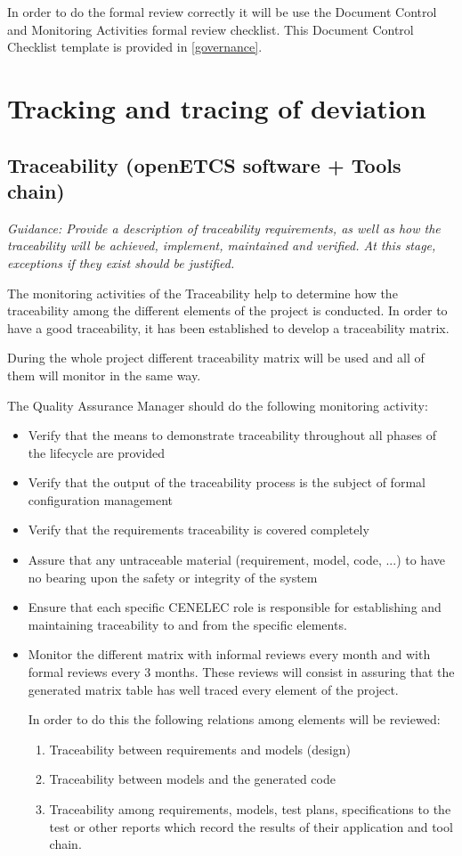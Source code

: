 \documentclass{template/openetcs_article}
\begin{document}
In order to do the formal review correctly it will be use the Document Control and Monitoring Activities formal review checklist.  This Document Control Checklist template is provided in \href{https://github.com/openETCS/governance/tree/master/Templates}{[governance]}.

\section{Tracking and tracing of deviation}

\subsection{Traceability (openETCS software + Tools chain)}
\textit{Guidance: Provide a description of traceability requirements, as well as how the traceability will be achieved, implement, maintained and verified. At this stage, exceptions if they exist should be justified.}

The monitoring activities of the Traceability help to determine how the traceability among the different elements of the project is conducted. In order to have a good traceability, it has been established to develop a traceability matrix. 

During the whole project different traceability matrix will be used and all of them will monitor in the same way.

The Quality Assurance Manager should do the following monitoring activity:
\begin{itemize}
\item Verify that the means to demonstrate traceability throughout all phases of the lifecycle are provided
\item Verify that the output of the traceability process is the subject of formal configuration management
\item Verify that the requirements traceability is covered completely
\item Assure that any untraceable material (requirement, model, code, ...) to have no bearing upon the safety or integrity of the system
\item Ensure that each specific CENELEC role is responsible for establishing and maintaining traceability to and from the specific elements.
\item Monitor the different matrix with informal reviews every month and with formal reviews every 3 months. These reviews will consist in assuring that the generated matrix table has well traced every element of the project.

In order to do this the following relations among elements will be reviewed:
\begin{enumerate}
\item Traceability between requirements and models (design)
\item Traceability between models and the generated code
\item Traceability among requirements, models, test plans, specifications to the test or other reports which record the results of their application and tool chain.
\end{enumerate}
\end{itemize}
\end{document}
